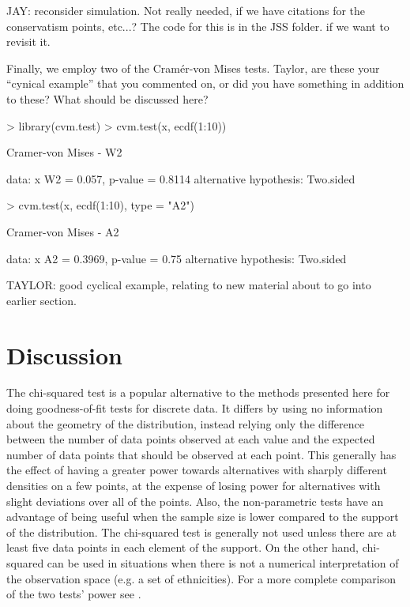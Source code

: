 JAY: reconsider simulation.  Not really needed, if we have citations for
the conservatism points, etc...?  The code for this is in the JSS folder.
if we want to revisit it.

Finally, we employ two of the Cram\'{e}r-von Mises tests.  Taylor, are these
your ``cynical example'' that you commented on, or did you have something
in addition to these?  What should be discussed here?

\begin{Schunk}
\begin{Sinput}
> library(cvm.test)
> cvm.test(x, ecdf(1:10))
\end{Sinput}
\begin{Soutput}
	Cramer-von Mises - W2

data:  x 
W2 = 0.057, p-value = 0.8114
alternative hypothesis: Two.sided 
\end{Soutput}
\begin{Sinput}
> cvm.test(x, ecdf(1:10), type = "A2")
\end{Sinput}
\begin{Soutput}
	Cramer-von Mises - A2

data:  x 
A2 = 0.3969, p-value = 0.75
alternative hypothesis: Two.sided 
\end{Soutput}
\end{Schunk}

TAYLOR: good cyclical example, relating to new material about to go into
earlier section.


\section{Discussion}

The chi-squared test is a popular alternative to the methods presented here for doing goodness-of-fit tests for discrete data.
It differs by using no information about the geometry of the distribution, instead relying only the difference between the 
number of data points observed at each value and the expected number of data points that should be observed at each point. 
This generally has the effect of having a greater power towards alternatives with sharply different densities on a few points,
at the expense of losing power for alternatives with slight deviations over all of the points. Also, the non-parametric tests
have an advantage of being useful when the sample size is lower compared to the support of the distribution. The chi-squared
test is generally not used unless there are at least five data points in each element of the support. On the other hand,
chi-squared can be used in situations when there is not a numerical interpretation of the observation space 
(e.g. a set of ethnicities).
For a more complete comparison of the two tests' power see \cite{slakter65}.

